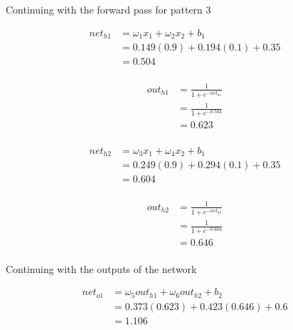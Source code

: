 \documentclass[10pt,a4paper]{article}
\begin{document}
Continuing with the forward pass for pattern 3

\begin{equation}
\begin{split}
net_{h1} &= \omega_1 x_1 + \omega_2 x_2 + b_1 \\
         &= 0.149(0.9) + 0.194(0.1) + 0.35 \\
         &= 0.504\\
\end{split}
\end{equation}

\begin{equation}
\begin{split}
out_{h1} &= \frac{1}{1+e^{-net_{h1}}}\\ 
         &= \frac{1}{1+e^{-0.504}}\\ 
         &= 0.623\\
\end{split}
\end{equation}

\begin{equation}
\begin{split}
net_{h2} &= \omega_3 x_1 + \omega_4 x_2 + b_1 \\
         &= 0.249(0.9) + 0.294(0.1) + 0.35 \\
         &= 0.604\\
\end{split}
\end{equation}

\begin{equation}
\begin{split}
out_{h2} &= \frac{1}{1+e^{-net_{h2}}}\\ 
         &= \frac{1}{1+e^{-0.604}}\\ 
         &= 0.646\\
\end{split}
\end{equation}

Continuing with the outputs of the network

\begin{equation}
\begin{split}
net_{o1} &= \omega_5 out_{h1} + \omega_6 out_{h2} + b_2 \\
         &= 0.373(0.623) + 0.423(0.646) + 0.6 \\
         &= 1.106\\
\end{split}
\end{equation}
\end{document}
